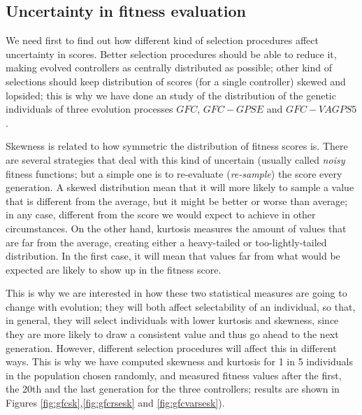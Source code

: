 \documentclass[10pt,journal,compsoc]{IEEEtran}
\begin{document}
\subsection{Uncertainty in fitness evaluation}

We need first to find out how different kind of selection procedures
affect uncertainty in scores. Better selection procedures should be
able to reduce it, making evolved controllers as centrally distributed
as possible; other kind of selections should keep distribution of
scores (for a single controller) skewed and lopsided; this is why we
have done an study of the distribution  of the genetic individuals of
three evolution processes $GFC$, $GFC-GPSE$ and $GFC-VAGPS5$. 


Skewness is related to how symmetric the distribution of fitness
scores is. There are several strategies that deal with this kind of
uncertain (usually called {\em noisy} fitness functions; but a simple
one is to re-evaluate ({\em re-sample}) the score every generation. A
skewed distribution mean that it will more likely to sample a value
that is different from the average, but it might be better or worse
than average; in any case, different from the score we would expect to
achieve in other circumstances. On the other hand, kurtosis measures
the amount of values that are far from the average, creating either a
heavy-tailed or too-lightly-tailed distribution. In the first case, it
will mean that values far from what would be expected are likely to
show up in the fitness score.

This is why we are interested in how these two statistical measures
are going to change with evolution; they will both affect
selectability of an individual, so that, in general, they will select
individuals with lower kurtosis and skewness, since they are more
likely to draw a consistent value and thus go ahead to the next
generation. However, different selection procedures will affect this
in different ways. This is why we have computed skewness and kurtosis for 1 in 5 individuals in the
population chosen randomly, and measured fitness values after the
first, the 20th and the last generation for the three controllers;
results are shown in Figures \ref{fig:gfcsk},\ref{fig:gfcrsesk} and
\ref{fig:gfcvarsesk}). %
\end{document}

